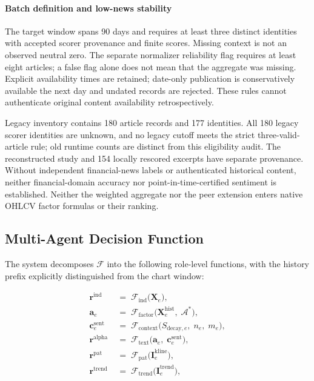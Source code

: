 \paragraph{Batch definition and low-news stability}
The target window spans 90 days and requires at least three distinct identities with accepted scorer provenance and finite scores. Missing context is not an observed neutral zero. The separate normalizer reliability flag requires at least eight articles; a false flag alone does not mean that the aggregate was missing. Explicit availability times are retained; date-only publication is conservatively available the next day and undated records are rejected. These rules cannot authenticate original content availability retrospectively.

Legacy inventory contains 180 article records and 177 identities. All 180 legacy scorer identities are unknown, and no legacy cutoff meets the strict three-valid-article rule; old runtime counts are distinct from this eligibility audit. The reconstructed study and 154 locally rescored excerpts have separate provenance. Without independent financial-news labels or authenticated historical content, neither financial-domain accuracy nor point-in-time-certified sentiment is established. Neither the weighted aggregate nor the peer extension enters native OHLCV factor formulas or their ranking.

\subsection{Multi-Agent Decision Function}
The system decomposes $\mathcal{F}$ into the following role-level functions, with the history prefix explicitly distinguished from the chart window:

\begin{align}
    \mathbf{r}^{\mathrm{ind}}
    &\;=\; \mathcal{F}_{\mathrm{ind}}\!\bigl(\mathbf{X}_e\bigr),
    \label{eq:ind} \\
    \mathbf{a}_e
    &\;=\; \mathcal{F}_{\mathrm{factor}}\!\bigl(
            \mathbf{X}^{\mathrm{hist}}_e,\; \mathcal{A}^{*}
           \bigr),
    \label{eq:alpha_factor} \\
    \mathbf{c}^{\mathrm{sent}}_e
    &\;=\; \mathcal{F}_{\mathrm{context}}\!\bigl(
            S_{\mathrm{decay},e},\; n_e,\; m_e
           \bigr),
    \label{eq:sent_context} \\
    \mathbf{r}^{\mathrm{alpha}}
    &\;=\; \mathcal{F}_{\mathrm{text}}\!\bigl(
            \mathbf{a}_e,\; \mathbf{c}^{\mathrm{sent}}_e
           \bigr),
    \label{eq:alpha} \\
    \mathbf{r}^{\mathrm{pat}}
    &\;=\; \mathcal{F}_{\mathrm{pat}}\!\bigl(
            \mathbf{I}^{\mathrm{kline}}_e
           \bigr),
    \label{eq:pat} \\
    \mathbf{r}^{\mathrm{trend}}
    &\;=\; \mathcal{F}_{\mathrm{trend}}\!\bigl(
            \mathbf{I}^{\mathrm{trend}}_e
           \bigr),
    \label{eq:trend}
\end{align}


